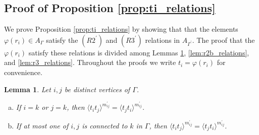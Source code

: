 \documentclass[11pt]{amsart}
\newtheorem{lem}[thm]{Lemma}
\theoremstyle{definition}
\begin{document}
\subsection{Proof of Proposition \ref{prop:ti_relations}}\label{sec:proof_of_ti_relations}

We prove Proposition \ref{prop:ti_relations} by showing that that the elements $\varphi(r_i)\in A_\Gamma$ satisfy the $(R2^\prime)$ and $(R3^\prime)$ relations in $A_{\Gamma^\prime}$.  The proof that the $\varphi(r_i)$ satisfy these relations is divided among Lemmas \ref{lem:r2a_relations}, \ref{lem:r2b_relations}, and \ref{lem:r3_relations}.  Throughout the proofs we write $t_i = \varphi(r_i)$ for convenience.


\begin{lem}\label{lem:r2a_relations}
Let $i,j$ be distinct vertices of $\Gamma$.
\begin{enumerate}[(a)]
\item If $i=k$ or $j=k$, then $\langle t_it_j \rangle^{m_{ij}^\prime} = \langle t_jt_i \rangle^{m_{ij}^\prime}$.
\item If at most one of $i,j$ is connected to $k$ in $\Gamma$, then $\langle t_it_j \rangle^{m_{ij}^\prime} = \langle t_jt_i \rangle^{m_{ij}^\prime}$.
\end{enumerate}
\end{lem}
\end{document}
